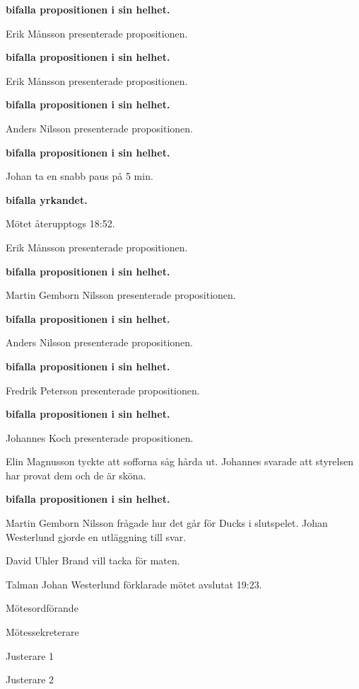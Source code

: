 \documentclass[10pt]{article}
\def\mo{Johan Westerlund}
\def\ms{Erik Månsson}
\def\ji{Olle Oswald}
\def\jii{David Uhler Brand}
\begin{document}
\begin{paragrafer}
\begin{paragrafer}
      \textbf{\Mba bifalla propositionen i sin helhet.}

        Erik Månsson presenterade propositionen.

        \textbf{\Mba bifalla propositionen i sin helhet.}

        Erik Månsson presenterade propositionen.

        \textbf{\Mba bifalla propositionen i sin helhet.}

        Anders Nilsson presenterade propositionen.

        \textbf{\Mba bifalla propositionen i sin helhet.}

        Johan \ypa ta en snabb paus på 5 min.

        \textbf{\Mba bifalla yrkandet.}

        Mötet återupptogs 18:52.

        Erik Månsson presenterade propositionen.

        \textbf{\Mba bifalla propositionen i sin helhet.}

          Martin Gemborn Nilsson presenterade propositionen.

          \textbf{\Mba bifalla propositionen i sin helhet.}

          Anders Nilsson presenterade propositionen.

          \textbf{\Mba bifalla propositionen i sin helhet.}

        Fredrik Peterson presenterade propositionen.

        \textbf{\Mba bifalla propositionen i sin helhet.}

        Johannes Koch presenterade propositionen.

        Elin Magnusson tyckte att sofforna såg hårda ut. Johannes svarade att styrelsen har provat dem och de är sköna.

        \textbf{\Mba bifalla propositionen i sin helhet.}

  \end{paragrafer}
Martin Gemborn Nilsson frågade hur det går för Ducks i slutspelet. Johan Westerlund gjorde en utläggning till svar.

David Uhler Brand vill tacka för maten.

Talman {\mo} förklarade mötet avslutat 19:23.

\end{paragrafer}

\hidesignfoot
\begin{signatures}{4}
\signature{\mo}{Mötesordförande}
\signature{\ms}{Mötessekreterare}
\signature{\ji}{Justerare 1}
\signature{\jii}{Justerare 2}
\end{signatures}
\end{document}
